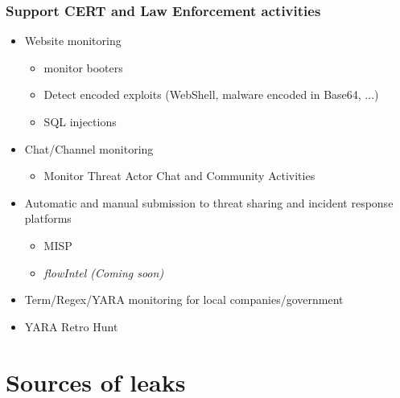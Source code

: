 \documentclass[10pt,aspectratio=169, colorlinks=true, linkcolor=circlBlue]{beamer}
\begin{document}
\begin{frame}
    \frametitle{Support CERT and Law Enforcement activities}
    	\begin{itemize}
		    \item Website monitoring
		    	\begin{itemize}
				    \item monitor booters
				    \item Detect encoded exploits (WebShell, malware encoded in Base64, ...)
				    \item SQL injections
		    	\end{itemize}
		    \item Chat/Channel monitoring
		        \begin{itemize}
				    \item Monitor Threat Actor Chat and Community Activities
		        \end{itemize}
		    \item Automatic and manual submission to threat sharing and incident response platforms
			    \begin{itemize}
				    \item MISP
				    \item \textit{flowIntel (Coming soon)}
			    \end{itemize}
		    \item Term/Regex/YARA monitoring for local companies/government
		    \item YARA Retro Hunt
        \end{itemize}
\end{frame}

\section{Sources of leaks}
\end{document}

